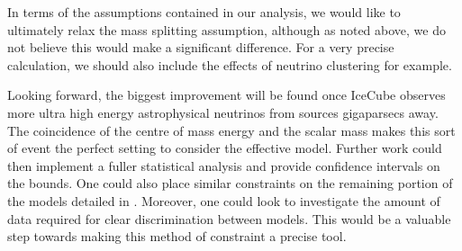 \documentclass[11pt]{article}
\numberwithin{equation}{section}
\numberwithin{figure}{section}
\numberwithin{table}{section}
\begin{document}
In terms of the assumptions contained in our analysis, we would like to ultimately relax the mass splitting assumption, although as noted above, we do not believe this would make a significant difference. For a very precise calculation, we should also include the effects of neutrino clustering for example.

Looking forward, the biggest improvement will be found once IceCube observes more ultra high energy astrophysical neutrinos from sources gigaparsecs away. The coincidence of the centre of mass energy and the scalar mass makes this sort of event the perfect setting to consider the effective model. Further work could then implement a fuller statistical analysis and provide confidence intervals on the bounds. One could also place similar constraints on the remaining portion of the models detailed in \cite{BoehmPascoli}. Moreover, one could look to investigate the amount of data required for clear discrimination between models. This would be a valuable step towards making this method of constraint a precise tool.








\newpage
\appendix
\end{document}
